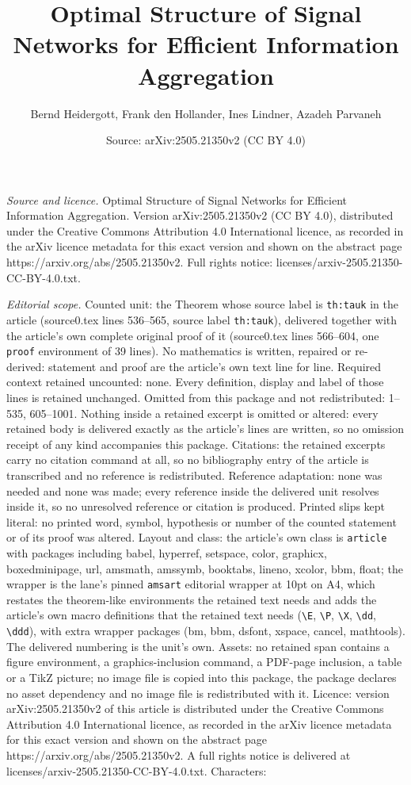 \documentclass[10pt,a4paper]{amsart}
\title[Optimal Structure of Signal Networks for Efficient Informati]{Optimal Structure of Signal Networks for Efficient Information Aggregation}
\author{Bernd Heidergott, Frank den Hollander, Ines Lindner, Azadeh Parvaneh}
\date{Source: arXiv:2505.21350v2 (CC BY 4.0)}
\begin{document}
\maketitle

\noindent\emph{Source and licence.} Optimal Structure of Signal Networks for Efficient Information Aggregation. Version arXiv:2505.21350v2 (CC BY 4.0), distributed under the Creative Commons Attribution 4.0 International licence, as recorded in the arXiv licence metadata for this exact version and shown on the abstract page https://arxiv.org/abs/2505.21350v2. Full rights notice: licenses/arxiv-2505.21350-CC-BY-4.0.txt.\par\smallskip

\noindent\textit{Editorial scope.} Counted unit: the Theorem whose source label is \texttt{th:tauk} in the article (source0.tex lines 536--565, source label \texttt{th:tauk}), delivered together with the article's own complete original proof of it (source0.tex lines 566--604, one \texttt{proof} environment of 39 lines). No mathematics is written, repaired or re-derived: statement and proof are the article's own text line for line. Required context retained uncounted: none. Every definition, display and label of those lines is retained unchanged. Omitted from this package and not redistributed: 1--535, 605--1001. Nothing inside a retained excerpt is omitted or altered: every retained body is delivered exactly as the article's lines are written, so no omission receipt of any kind accompanies this package. Citations: the retained excerpts carry no citation command at all, so no bibliography entry of the article is transcribed and no reference is redistributed. Reference adaptation: none was needed and none was made; every reference inside the delivered unit resolves inside it, so no unresolved reference or citation is produced. Printed slips kept literal: no printed word, symbol, hypothesis or number of the counted statement or of its proof was altered. Layout and class: the article's own class is \texttt{article} with packages including babel, hyperref, setspace, color, graphicx, boxedminipage, url, amsmath, amssymb, booktabs, lineno, xcolor, bbm, float; the wrapper is the lane's pinned \texttt{amsart} editorial wrapper at 10pt on A4, which restates the theorem-like environments the retained text needs and adds the article's own macro definitions that the retained text needs (\texttt{\textbackslash E}, \texttt{\textbackslash P}, \texttt{\textbackslash X}, \texttt{\textbackslash dd}, \texttt{\textbackslash ddd}), with extra wrapper packages (bm, bbm, dsfont, xspace, cancel, mathtools). The delivered numbering is the unit's own. Assets: no retained span contains a figure environment, a graphics-inclusion command, a PDF-page inclusion, a table or a TikZ picture; no image file is copied into this package, the package declares no asset dependency and no image file is redistributed with it. Licence: version arXiv:2505.21350v2 of this article is distributed under the Creative Commons Attribution 4.0 International licence, as recorded in the arXiv licence metadata for this exact version and shown on the abstract page https://arxiv.org/abs/2505.21350v2. A full rights notice is delivered at licenses/arxiv-2505.21350-CC-BY-4.0.txt. Characters: 
\end{document}
